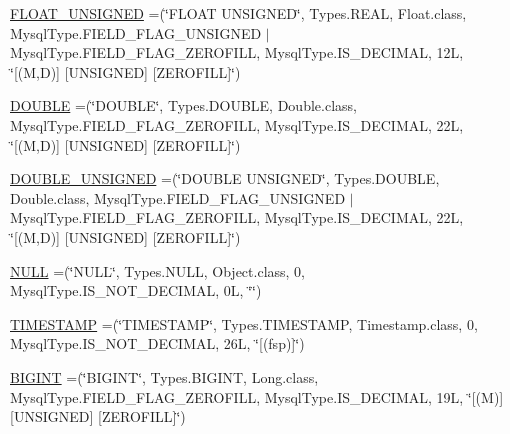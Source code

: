 \begin{DoxyCompactItemize}
\item 
\mbox{\hyperlink{enumcom_1_1mysql_1_1cj_1_1_mysql_type_a095a818e7723ff0543eaed09f06694fa}{F\+L\+O\+A\+T\+\_\+\+U\+N\+S\+I\+G\+N\+ED}} =(\char`\"{}F\+L\+O\+AT U\+N\+S\+I\+G\+N\+ED\char`\"{}, Types.\+R\+E\+AL, Float.\+class, Mysql\+Type.\+F\+I\+E\+L\+D\+\_\+\+F\+L\+A\+G\+\_\+\+U\+N\+S\+I\+G\+N\+ED $\vert$ Mysql\+Type.\+F\+I\+E\+L\+D\+\_\+\+F\+L\+A\+G\+\_\+\+Z\+E\+R\+O\+F\+I\+LL, Mysql\+Type.\+I\+S\+\_\+\+D\+E\+C\+I\+M\+AL, 12\+L, \char`\"{}\mbox{[}(\+M,\+D)\mbox{]} \mbox{[}\+U\+N\+S\+I\+G\+N\+E\+D\mbox{]} \mbox{[}\+Z\+E\+R\+O\+F\+I\+L\+L\mbox{]}\char`\"{})
\item 
\mbox{\hyperlink{enumcom_1_1mysql_1_1cj_1_1_mysql_type_a3f95bc5758ff4e4f6ce9cd1fb1889400}{D\+O\+U\+B\+LE}} =(\char`\"{}D\+O\+U\+B\+LE\char`\"{}, Types.\+D\+O\+U\+B\+LE, Double.\+class, Mysql\+Type.\+F\+I\+E\+L\+D\+\_\+\+F\+L\+A\+G\+\_\+\+Z\+E\+R\+O\+F\+I\+LL, Mysql\+Type.\+I\+S\+\_\+\+D\+E\+C\+I\+M\+AL, 22\+L, \char`\"{}\mbox{[}(\+M,\+D)\mbox{]} \mbox{[}\+U\+N\+S\+I\+G\+N\+E\+D\mbox{]} \mbox{[}\+Z\+E\+R\+O\+F\+I\+L\+L\mbox{]}\char`\"{})
\item 
\mbox{\hyperlink{enumcom_1_1mysql_1_1cj_1_1_mysql_type_a9ca99746f8ab3f53a3b0b9ad9599f5c0}{D\+O\+U\+B\+L\+E\+\_\+\+U\+N\+S\+I\+G\+N\+ED}} =(\char`\"{}D\+O\+U\+B\+LE U\+N\+S\+I\+G\+N\+ED\char`\"{}, Types.\+D\+O\+U\+B\+LE, Double.\+class, Mysql\+Type.\+F\+I\+E\+L\+D\+\_\+\+F\+L\+A\+G\+\_\+\+U\+N\+S\+I\+G\+N\+ED $\vert$ Mysql\+Type.\+F\+I\+E\+L\+D\+\_\+\+F\+L\+A\+G\+\_\+\+Z\+E\+R\+O\+F\+I\+LL, Mysql\+Type.\+I\+S\+\_\+\+D\+E\+C\+I\+M\+AL, 22\+L, \char`\"{}\mbox{[}(\+M,\+D)\mbox{]} \mbox{[}\+U\+N\+S\+I\+G\+N\+E\+D\mbox{]} \mbox{[}\+Z\+E\+R\+O\+F\+I\+L\+L\mbox{]}\char`\"{})
\item 
\mbox{\hyperlink{enumcom_1_1mysql_1_1cj_1_1_mysql_type_afd999a269aedd95acf6ae2453b95e2a3}{N\+U\+LL}} =(\char`\"{}N\+U\+LL\char`\"{}, Types.\+N\+U\+LL, Object.\+class, 0, Mysql\+Type.\+I\+S\+\_\+\+N\+O\+T\+\_\+\+D\+E\+C\+I\+M\+AL, 0\+L, \char`\"{}\char`\"{})
\item 
\mbox{\hyperlink{enumcom_1_1mysql_1_1cj_1_1_mysql_type_a8d26bb8a1cf3f337d3294ff11f50c5ae}{T\+I\+M\+E\+S\+T\+A\+MP}} =(\char`\"{}T\+I\+M\+E\+S\+T\+A\+MP\char`\"{}, Types.\+T\+I\+M\+E\+S\+T\+A\+MP, Timestamp.\+class, 0, Mysql\+Type.\+I\+S\+\_\+\+N\+O\+T\+\_\+\+D\+E\+C\+I\+M\+AL, 26\+L, \char`\"{}\mbox{[}(fsp)\mbox{]}\char`\"{})
\item 
\mbox{\hyperlink{enumcom_1_1mysql_1_1cj_1_1_mysql_type_a5e0b78b90c1ad86e03b108c01d729118}{B\+I\+G\+I\+NT}} =(\char`\"{}B\+I\+G\+I\+NT\char`\"{}, Types.\+B\+I\+G\+I\+NT, Long.\+class, Mysql\+Type.\+F\+I\+E\+L\+D\+\_\+\+F\+L\+A\+G\+\_\+\+Z\+E\+R\+O\+F\+I\+LL, Mysql\+Type.\+I\+S\+\_\+\+D\+E\+C\+I\+M\+AL, 19\+L, \char`\"{}\mbox{[}(\+M)\mbox{]} \mbox{[}\+U\+N\+S\+I\+G\+N\+E\+D\mbox{]} \mbox{[}\+Z\+E\+R\+O\+F\+I\+L\+L\mbox{]}\char`\"{})

\end{DoxyCompactItemize}
